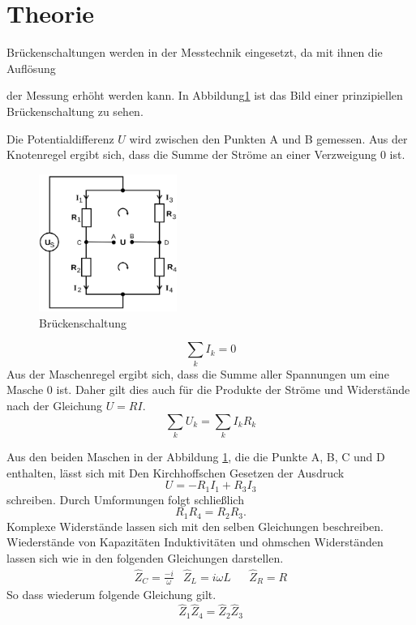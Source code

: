 \section{Theorie}
\label{sec:Theorie}

\cite{sample}
Brückenschaltungen werden in der Messtechnik eingesetzt, da mit ihnen die Auflösung

der Messung erhöht werden kann.
In Abbildung\ref{fig:Brueckenschaltung} ist das Bild einer prinzipiellen Brückenschaltung zu sehen.

Die Potentialdifferenz $U$ wird zwischen den Punkten A und B gemessen. Aus der
Knotenregel ergibt sich, dass die Summe der Ströme an einer Verzweigung $0$ ist.


\begin{figure}
  \centering
  \includegraphics[width=0.4\textwidth]{Bilder/Brueckenschaltung.png}
  \caption{Brückenschaltung}
  \label{fig:Brueckenschaltung}
\end{figure}
\begin{equation}
  \sum \limits_{k} I_k= 0
  \label{eq:knotenregel}
\end{equation}
Aus der Maschenregel ergibt sich, dass die Summe aller Spannungen um eine Masche
$0$ ist. Daher gilt dies auch für die Produkte der Ströme und Widerstände nach
der Gleichung $U=RI$.
\begin{equation}
  \sum \limits_{k} U_k=  \sum \limits_{k} I_k R_k
  \label{eq:Maschenregel}
\end{equation}

Aus den beiden Maschen in der Abbildung \ref{fig:Brueckenschaltung}, die die Punkte
A, B, C und D enthalten, lässt sich mit Den Kirchhoffschen Gesetzen
der Ausdruck
\begin{equation}
  U=-R_1 I_1 + R_3 I_3
\end{equation}
schreiben. Durch Umformungen folgt schließlich
\begin{equation}
  R_1 R_4 =R_2 R_3   .
  \label{eq:Widerstand}
\end{equation}
Komplexe Widerstände lassen sich mit den selben Gleichungen beschreiben.
Wiederstände von Kapazitäten Induktivitäten und ohmschen Widerständen lassen sich
wie in den folgenden Gleichungen darstellen.
\begin{align}
&\hat{Z}_C = \frac{-i}{\omega}  &  \hat{Z}_L=i\omega L & & \hat{Z}_R = R &
\end{align}
So dass wiederum folgende Gleichung gilt.
\begin{equation}
\hat{Z}_1\hat{Z}_4=\hat{Z}_2\hat{Z}_3
\end{equation}
